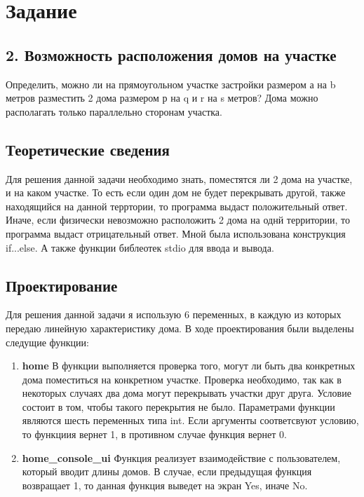 \documentclass[12pt,a4paper]{report}
\begin{document}
\section{Задание}
\subsection{2. Возможность расположения домов на участке}
\hspace{\parindent}
Определить, можно ли на прямоугольном участке застройки размером а на b метров разместить 2 дома размером р на q и r на s метров? Дома можно располагать только параллельно сторонам участка.

\subsection{Теоретические сведения}
\hspace{\parindent}
Для решения данной задачи необходимо знать, поместятся ли 2 дома на участке, и на каком участке. То есть если один дом не будет перекрывать другой, также находящийся на данной терртории, то программа выдаст положительный ответ. Иначе, если физически невозможно
 расположить 2 дома на однй территории, то программа выдаст отрицательный ответ. Мной была использована конструкция if...else. А также  функции библеотек stdio для ввода и вывода.

\subsection{Проектирование}
\hspace{\parindent}
Для решения данной задачи я использую 6 переменных, в каждую из которых передаю линейную характеристику дома.
	В ходе проектирования были выделены следущие функции:
\begin{enumerate}
	\item \textbf{home}
	В  функции выполняется проверка того, могут ли быть два конкретных дома поместиться на конкретном  участке. Проверка необходимо, так как в некоторых случаях два дома могут перекрывать участки друг друга. Условие состоит в том, чтобы такого перекрытия не было.
	Параметрами функции являются шесть переменных типа int. Если аргументы соответсвуют условию, то функциия вернет 1, в противном случае функция вернет 0.
		\item \textbf{home\_console\_ui}
	Функция реализует взаимодействие с пользователем, который вводит длины домов. В случае, если предыдущая функция возвращает 1, то данная функция выведет на экран Yes, иначе No.
\end{enumerate}
\end{document}
